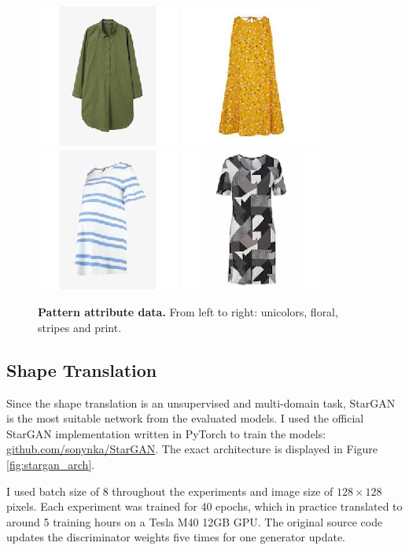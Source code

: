 \documentclass[12pt]{report}
\begin{document}
\begin{figure}[!h]
{\includegraphics[width=.2\linewidth]{03_analysis/data/pattern_unicolors}}
{\includegraphics[width=.2\linewidth]{03_analysis/data/pattern_floral}}
{\includegraphics[width=.2\linewidth]{03_analysis/data/pattern_stripes}}
{\includegraphics[width=.2\linewidth]{03_analysis/data/pattern_print}}
\caption{\label{fig:pattern_data} \textbf{Pattern attribute data.} From left to right: unicolors, floral, stripes and print.}
\end{figure}

\pagebreak
\subsection{Shape Translation}
Since the shape translation is an unsupervised and multi-domain task, StarGAN is the most suitable network from the evaluated models. I used the official StarGAN implementation written in PyTorch to train the models: \hyperlink{https://github.com/sonynka/StarGAN}{github.com/sonynka/StarGAN}. The exact architecture is displayed in Figure \ref{fig:stargan_arch}.

I used batch size of 8 throughout the experiments and image size of $128 \times 128$ pixels. Each experiment was trained for 40 epochs, which in practice translated to around 5 training hours on a Tesla M40 12GB GPU. The original source code updates the discriminator weights five times for one generator update. 
\end{document}

